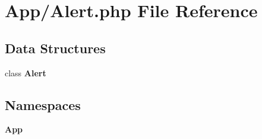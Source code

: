 \section{App/\+Alert.php File Reference}
\label{_alert_8php}
\subsection*{Data Structures}
\begin{DoxyCompactItemize}
\item 
class \textbf{ Alert}
\end{DoxyCompactItemize}
\subsection*{Namespaces}
\begin{DoxyCompactItemize}
\item 
 \textbf{ App}
\end{DoxyCompactItemize}
